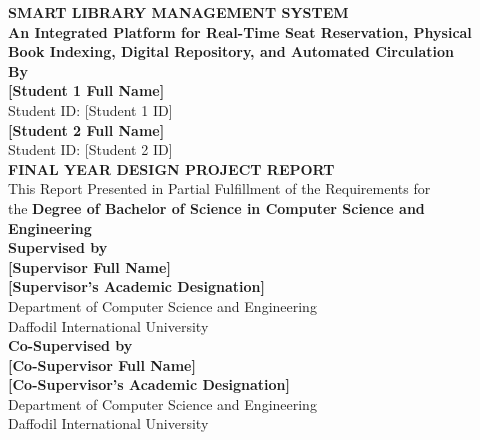 \begin{titlepage}
    \centering
    
    {\fontsize{18pt}{22pt}\selectfont \textbf{SMART LIBRARY MANAGEMENT SYSTEM}}\\[0.2cm]
    {\fontsize{14pt}{18pt}\selectfont \textbf{An Integrated Platform for Real-Time Seat Reservation, Physical Book Indexing, Digital Repository, and Automated Circulation}}\\[0.7cm]
    
    {\normalsize \textbf{By}}\\[0.25cm]
    {\normalsize \textbf{[Student 1 Full Name]}}\\[0.05cm]
    {\normalsize Student ID: [Student 1 ID]}\\[0.35cm]
    {\normalsize \textbf{[Student 2 Full Name]}}\\[0.05cm]
    {\normalsize Student ID: [Student 2 ID]}\\[0.65cm]
    
    {\normalsize \textbf{FINAL YEAR DESIGN PROJECT REPORT}}\\[0.25cm]
    {\small This Report Presented in Partial Fulfillment of the Requirements for}\\[0.05cm]
    {\small the \textbf{Degree of Bachelor of Science in Computer Science and}}\\[0.05cm]
    {\small \textbf{Engineering}}\\[0.65cm]
    
    {\normalsize \textbf{Supervised by}}\\[0.25cm]
    {\normalsize \textbf{[Supervisor Full Name]}}\\[0.05cm]
    {\normalsize \textbf{[Supervisor's Academic Designation]}}\\[0.05cm]
    {\small Department of Computer Science and Engineering}\\[0.05cm]
    {\small Daffodil International University}\\[0.55cm]
    
    {\normalsize \textbf{Co-Supervised by}}\\[0.25cm]
    {\normalsize \textbf{[Co-Supervisor Full Name]}}\\[0.05cm]
    {\normalsize \textbf{[Co-Supervisor's Academic Designation]}}\\[0.05cm]
    {\small Department of Computer Science and Engineering}\\[0.05cm]
    {\small Daffodil International University}\\[0.6cm]
    

\end{titlepage}
